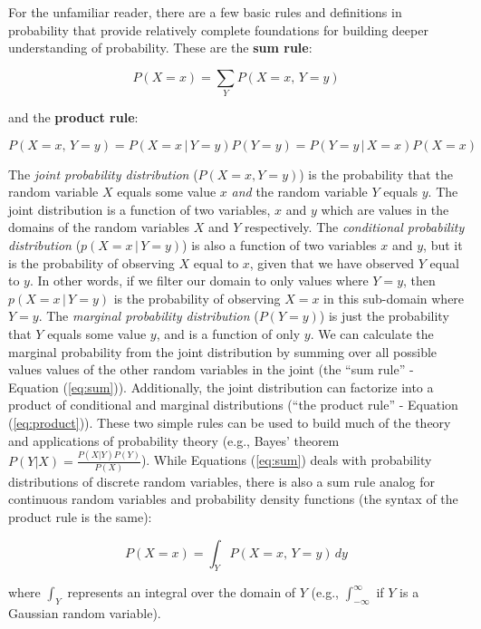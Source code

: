 \documentclass[12pt]{article}
\begin{document}
For the unfamiliar reader, there are a few basic rules and definitions
in probability that provide relatively complete foundations for
building deeper understanding of probability. These are the \textbf{sum rule}:

\begin{equation}
  P(X=x) = \sum_Y P(X=x,\, Y=y)
  \label{eq:sum}
\end{equation}

and the \textbf{product rule}:

\begin{equation}
  P(X=x, \, Y=y) = P(X = x \, | \, Y=y ) P(Y=y) = P(Y = y \, | \, X=x ) P(X=x)
  \label{eq:product}
\end{equation}

The \textit{joint probability distribution} ($P(X=x,Y=y)$) is the
probability that the random variable $X$ equals some value $x$ \emph{and} the
random variable $Y$ equals $y$. The joint distribution is a function
of two variables, $x$ and $y$ which are values in the domains of the
random variables $X$ and $Y$ respectively. The \textit{conditional
  probability distribution} ($p(X = x \, | \, Y=y )$) is also a
function of two variables $x$ and $y$, but it is the probability of
observing $X$ equal to $x$, given that we have observed $Y$ equal to
$y$. In other words, if we filter our domain to only values where
$Y=y$, then $p(X = x \, | \, Y=y )$ is the probability of
observing $X=x$ in this sub-domain where $Y=y$. The \textit{marginal
  probability distribution} ($P(Y=y)$) is just the probability that
$Y$ equals some value $y$, and is a function of only $y$. We can
calculate the marginal probability from the joint distribution by
summing over all possible values values of the other random variables
in the joint (the ``sum rule'' - Equation (\ref{eq:sum})). Additionally,
the joint distribution can factorize into a product of conditional and
marginal distributions (``the product rule'' - Equation
(\ref{eq:product})). These two simple rules can be used to build much of the
theory and applications of probability theory (e.g., Bayes' theorem
$P(Y|X) =\frac{P(X|Y) P(Y)}{P(X)}$). While Equations (\ref{eq:sum})
deals with probability distributions of discrete random variables,
there is also a sum rule analog for continuous random variables and
probability density functions (the syntax of the product rule is the
same):

\begin{equation*}
  P(X=x) = \int_Y P(X=x,\, Y=y) \, dy
\end{equation*}

where $\int_{Y}$ represents an integral over the domain of $Y$ (e.g.,
$\int_{-\infty}^{\infty}$ if $Y$ is a Gaussian random variable).
\end{document}
